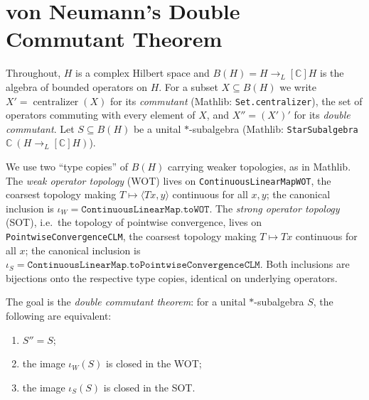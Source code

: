 


\section{von Neumann's Double Commutant Theorem}

Throughout, $H$ is a complex Hilbert space and $B(H) = H \to_L[\mathbb C] H$ is the
algebra of bounded operators on $H$. For a subset $X \subseteq B(H)$ we write
$X' = \operatorname{centralizer}(X)$ for its \emph{commutant} (Mathlib:
\texttt{Set.centralizer}), the set of operators commuting with every element of
$X$, and $X'' = (X')'$ for its \emph{double commutant}. Let
$S \subseteq B(H)$ be a unital $*$-subalgebra (Mathlib:
\texttt{StarSubalgebra}~$\mathbb C\ (H \to_L[\mathbb C] H)$).

We use two ``type copies'' of $B(H)$ carrying weaker topologies, as in Mathlib.
The \emph{weak operator topology} (WOT) lives on
\texttt{ContinuousLinearMapWOT}, the coarsest topology making
$T \mapsto \langle T x, y\rangle$ continuous for all $x, y$; the canonical
inclusion is $\iota_W = \texttt{ContinuousLinearMap.toWOT}$. The \emph{strong
operator topology} (SOT), i.e.\ the topology of pointwise convergence, lives on
\texttt{PointwiseConvergenceCLM}, the coarsest topology making
$T \mapsto T x$ continuous for all $x$; the canonical inclusion is
$\iota_S = \texttt{ContinuousLinearMap.toPointwiseConvergenceCLM}$. Both
inclusions are bijections onto the respective type copies, identical on
underlying operators.

The goal is the \emph{double commutant theorem}: for a unital $*$-subalgebra
$S$, the following are equivalent:
\begin{enumerate}
  \item $S'' = S$;
  \item the image $\iota_W(S)$ is closed in the WOT;
  \item the image $\iota_S(S)$ is closed in the SOT.
\end{enumerate}

